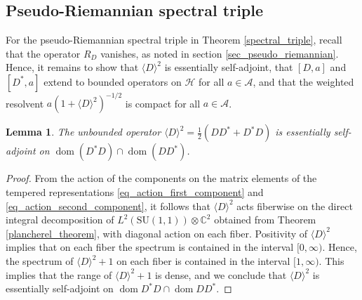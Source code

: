 \documentclass{amsart}
\newtheorem{lemma}[theorem]{Lemma}
\theoremstyle{definition}
\theoremstyle{remark}
\DeclareMathOperator{\dom}{dom}
\numberwithin{equation}{section}
\begin{document}
\subsection{Pseudo-Riemannian spectral triple} For the pseudo-Riemannian spectral triple in Theorem \ref{spectral_triple}, recall that the operator $R_D$ vanishes, as noted in section \ref{sec_pseudo_riemannian}. Hence, it remains to show that $\langle D\rangle^2$ is essentially self-adjoint, that $[D,a]$ and $[D^*,a]$ extend to bounded operators on $\mathcal{H}$ for all $a\in\mathcal{A}$, and that the weighted resolvent $a(1+\langle D\rangle^2)^{-1/2}$ is compact for all $a\in\mathcal{A}$.

\begin{lemma}\label{essentially_self-adjoint}
    The unbounded operator $\langle D\rangle^2=\tfrac{1}{2}(DD^*+D^*D)$ is essentially self-adjoint on $\dom(D^*D)\cap\dom(DD^*)$.
\end{lemma}
\begin{proof}
    From the action of the components on the matrix elements of the tempered representations \eqref{eq_action_first_component} and \eqref{eq_action_second_component}, it follows that $\langle D\rangle^2$ acts fiberwise on the direct integral decomposition of $L^2(\mathrm{SU}(1,1))\otimes \mathbb{C}^2$ obtained from Theorem \ref{plancherel_theorem}, with diagonal action on each fiber. Positivity of $\langle D\rangle^2$ implies that on each fiber the spectrum is contained in the interval $[0,\infty)$. Hence, the spectrum of $\langle D\rangle^2+1$ on each fiber is contained in the interval $[1,\infty)$. This implies that the range of $\langle D\rangle^2+1$ is dense, and we conclude that $\langle D\rangle^2$ is essentially self-adjoint on $\dom D^*D\cap\dom DD^*$.
\end{proof}
\end{document}
